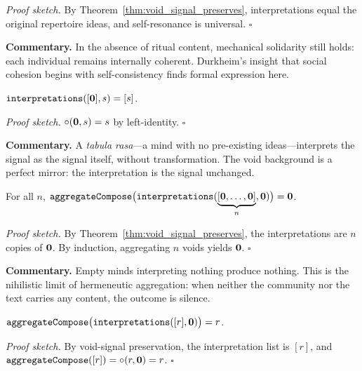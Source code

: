\noindent\textit{Proof sketch.}\quad
By Theorem~\ref{thm:void_signal_preserves}, interpretations equal the
original repertoire ideas, and self-resonance is universal.
\hfill$\square$

\medskip

\noindent\textbf{Commentary.}
In the absence of ritual content, mechanical solidarity still holds: each
individual remains internally coherent.  Durkheim's insight that social
cohesion begins with self-consistency finds formal expression here.

\begin{theorem}
\label{thm:void_background_interpretation}
$\texttt{interpretations}([\mathbf{0}], s) = [s]$.
\end{theorem}

\noindent\textit{Proof sketch.}\quad
$\circ(\mathbf{0}, s) = s$ by left-identity.
\hfill$\square$

\medskip

\noindent\textbf{Commentary.}
A \textit{tabula rasa}---a mind with no pre-existing ideas---interprets the
signal as the signal itself, without transformation.  The void background
is a perfect mirror: the interpretation is the signal unchanged.

\begin{theorem}
\label{thm:void_aggregate_void}
For all $n$,
$\texttt{aggregateCompose}\bigl(\texttt{interpretations}(\underbrace{[\mathbf{0}, \ldots, \mathbf{0}]}_{n}, \mathbf{0})\bigr) = \mathbf{0}$.
\end{theorem}

\noindent\textit{Proof sketch.}\quad
By Theorem~\ref{thm:void_signal_preserves}, the interpretations are
$n$ copies of $\mathbf{0}$.  By induction, aggregating $n$ voids yields $\mathbf{0}$.
\hfill$\square$

\medskip

\noindent\textbf{Commentary.}
Empty minds interpreting nothing produce nothing.  This is the nihilistic
limit of hermeneutic aggregation: when neither the community nor the text
carries any content, the outcome is silence.

\begin{theorem}
\label{thm:aggregate_singleton_void}
$\texttt{aggregateCompose}\bigl(\texttt{interpretations}([r], \mathbf{0})\bigr) = r$.
\end{theorem}

\noindent\textit{Proof sketch.}\quad
By void-signal preservation, the interpretation list is $[r]$, and
$\texttt{aggregateCompose}([r]) = \circ(r, \mathbf{0}) = r$.
\hfill$\square$

